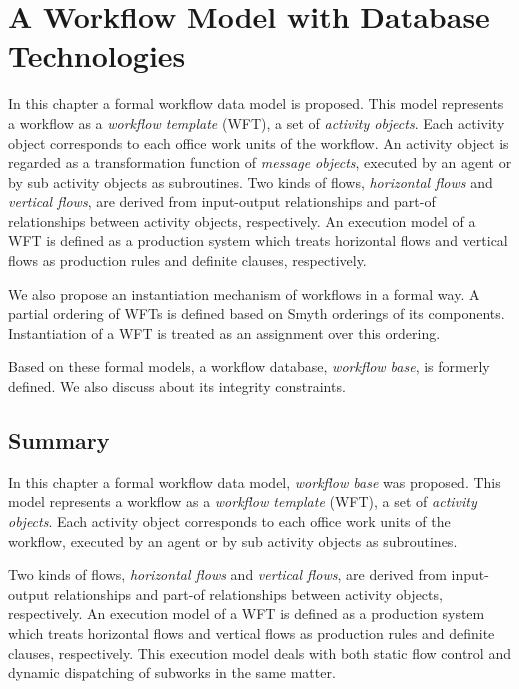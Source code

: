 
\chapter{A Workflow Model with Database Technologies}
\label{chap:wfbase}

In this chapter a formal workflow data model is proposed.  This model
represents a workflow as a \emph{workflow template} (WFT), a set of
\emph{activity objects}.  Each activity object corresponds to each
office work units of the workflow.  An activity object is regarded as a
transformation function of \emph{message objects}, executed by an agent
or by sub activity objects as subroutines.  Two kinds of flows,
\emph{horizontal flows} and \emph{vertical flows}, are derived from
input-output relationships and part-of relationships between activity
objects, respectively.  An execution model of a WFT is defined as a
production system which treats horizontal flows and vertical flows as
production rules and definite clauses, respectively.

We also propose an instantiation mechanism of workflows in a formal way.
A partial ordering of WFTs is defined based on Smyth orderings of its
components.  Instantiation of a WFT is treated as an assignment over this 
ordering.

Based on these formal models, a workflow database, \emph{workflow base},
is formerly defined.  We also discuss about its integrity constraints.




\section{Summary}
\label{sec:wfbase:conclu}

In this chapter a formal workflow data model, \emph{workflow base} was
proposed.  This model represents a workflow as a \emph{workflow
template} (WFT), a set of \emph{activity objects}.  Each activity object
corresponds to each office work units of the workflow, executed by an
agent or by sub activity objects as subroutines.  

Two kinds of flows, \emph{horizontal flows} and \emph{vertical flows},
are derived from input-output relationships and part-of relationships
between activity objects, respectively.  An execution model of a WFT is
defined as a production system which treats horizontal flows and
vertical flows as production rules and definite clauses,
respectively.  This execution model deals with both static flow control
and dynamic dispatching of subworks in the same matter.

